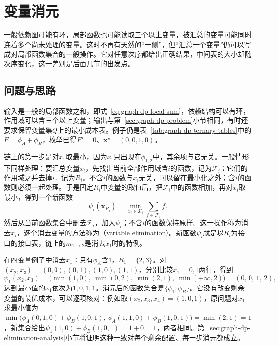 
\section{变量消元}
\label{sec:graph-variable-elimination}

一般依赖图可能有环，局部函数也可能读取三个以上变量，被汇总的变量可能同时连着多个尚未处理的变量。这时不再有天然的“一侧”，但“汇总一个变量”仍可以写成对局部函数集合的一般操作。它对任意次序都给出正确结果，中间表的大小却随次序变化，这一差别是后面几节的出发点。

\subsection{问题与思路}
\label{sec:graph-dp-elimination-idea}

输入是一般的局部函数之和，即式~\eqref{eq:graph-dp-local-sum}，依赖结构可以有环，作用域可以含三个以上变量；输出与第~\ref{sec:graph-dp-problem}小节相同，有时还要求保留变量集$Q$上的最小成本表。例子仍是表~\ref{tab:graph-dp-ternary-tables}中的$F=\phi_A+\phi_B$，枚举已得$F^\star=0$、$\bm x^\star=(0,0,1,0)$。

链上的第一步是对$x_1$取最小，因为$x_1$只出现在$\phi_{1,2}$中，其余项与它无关。一般情形下同样处理：要汇总变量$x_i$，先找出当前全部作用域含$i$的函数，记为$\mathcal F_i$；它们的作用域之并去掉$i$，记为$R_i$。不含$i$的函数与$x_i$无关，可以留在最小化之外；含$i$的函数则必须一起处理。于是固定$R_i$中变量的取值后，把$\mathcal F_i$中的函数相加，再对$x_i$取最小，得到一个新函数
\begin{equation}
\psi_i(\bm x_{R_i})=\min_{x_i\in\mathcal X_i}\sum_{f\in\mathcal F_i}f .
\label{eq:graph-dp-elimination-step}
\end{equation}
然后从当前函数集合中删去$\mathcal F_i$，加入$\psi_i$；不含$i$的函数保持原样。这一操作称为消去$x_i$，逐个消去变量的方法称为（variable elimination）。新函数$\psi_i$就是以$R_i$为接口的接口表，链上的$m_{1\to2}$是消去$x_1$时的特例。

在四变量例子中消去$x_1$：只有$\phi_A$含$1$，$R_1=\{2,3\}$。对$(x_2,x_3)=(0,0),(0,1),(1,0),(1,1)$，分别比较$x_1=0,1$两行，得到
\[
\psi_1(x_2,x_3)=\bigl(\min(1,0),\ \min(0,2),\ \min(2,1),\ \min(+\infty,2)\bigr)=(0,\,0,\,1,\,2),
\]
达到最小值的$x_1$依次为$1,0,1,1$。消元后的函数集合是$\{\psi_1,\phi_B\}$。它没有改变剩余变量的最优成本，可以逐项核对：例如取$(x_2,x_3,x_4)=(1,0,1)$，原问题对$x_1$求最小值为$\min\bigl(\phi_A(0,1,0)+\phi_B(1,0,1),\ \phi_A(1,1,0)+\phi_B(1,0,1)\bigr)=\min(2,1)=1$，新集合给出$\psi_1(1,0)+\phi_B(1,0,1)=1+0=1$，两者相同。第~\ref{sec:graph-dp-elimination-analysis}小节将证明这种一致对每个剩余配置、每一步消元都成立。

